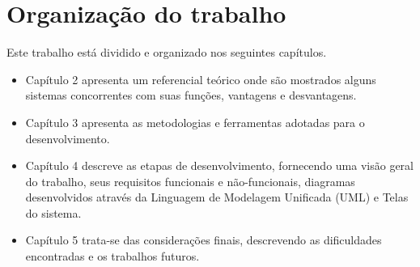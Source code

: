 \section{Organização do trabalho}
    
     Este trabalho está dividido e organizado nos seguintes capítulos.

\begin{itemize}
   \item Capítulo 2 apresenta um referencial teórico onde são mostrados alguns sistemas concorrentes com suas funções, vantagens e desvantagens.
   \item Capítulo 3 apresenta as metodologias e ferramentas adotadas para o desenvolvimento.
   \item Capítulo 4 descreve as etapas de desenvolvimento, fornecendo uma visão geral do trabalho, seus requisitos funcionais e não-funcionais, diagramas desenvolvidos através da Linguagem de Modelagem Unificada (UML) e Telas do sistema.
   \item Capítulo 5 trata-se das considerações finais, descrevendo as dificuldades encontradas e os trabalhos futuros.
   
 \end{itemize}







